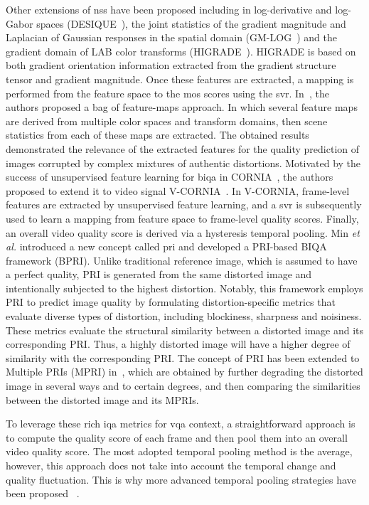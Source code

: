 \documentclass[journal]{IEEEtran}
\begin{document}
Other extensions of \ac{nss} have been proposed including in log-derivative and log-Gabor spaces  (DESIQUE~\cite{zhang2013no}), the joint statistics of the gradient magnitude and Laplacian of Gaussian responses in the spatial domain (GM-LOG~\cite{xue2014blind}) and the gradient domain of LAB color transforms (HIGRADE~\cite{kundu2017no}). HIGRADE is based on both gradient orientation information extracted from the gradient structure tensor and gradient magnitude. Once these features are extracted, a mapping is performed from the feature space to the \ac{mos} scores using the \ac{svr}. In~\cite{ghadiyaram2017perceptual}, the authors proposed a bag of feature-maps approach. In which several feature maps are derived from multiple color spaces and transform domains, then scene statistics from each of these maps are extracted. The obtained results demonstrated the relevance of the extracted features for the quality prediction of images corrupted by complex mixtures of authentic distortions. Motivated by the success of unsupervised feature learning for \ac{biqa} in CORNIA~\cite{ye2012unsupervised}, the authors proposed to extend it to video signal V-CORNIA~\cite{xu2014no}. In V-CORNIA, frame-level features are extracted by unsupervised feature learning, and a \ac{svr} is subsequently used to learn a mapping from feature space to frame-level quality scores. Finally, an overall video quality score is derived via a hysteresis temporal pooling. Min \textit{et al.} \cite{min2017blind,min2018blind} introduced a new concept called \ac{pri} and developed a PRI-based BIQA framework (BPRI). Unlike traditional reference image, which is assumed to have a perfect quality, PRI is generated from the same distorted image and intentionally subjected to the highest distortion. Notably, this framework employs PRI to predict image quality by formulating distortion-specific metrics that evaluate diverse types of distortion, including blockiness, sharpness and noisiness. These metrics evaluate the structural similarity between a distorted image and its corresponding PRI. Thus, a highly distorted image will have a higher degree of similarity with the corresponding PRI. The concept of PRI has been extended to Multiple PRIs (MPRI) in~\cite{min2018blind}, which are obtained by further degrading the distorted image in several ways and to certain degrees, and then comparing the similarities between the distorted image and its MPRIs.


To leverage these rich \ac{iqa} metrics for \ac{vqa} context, a straightforward approach is to compute the quality score of each frame and then pool them into an overall video quality score. The most adopted temporal pooling method is the average, however, this approach does not take into account the temporal change and quality fluctuation. This is why more advanced temporal pooling strategies have been proposed
~\cite{seshadrinathan2011temporal,xu2014no,tu2020comparative}.
\end{document}
